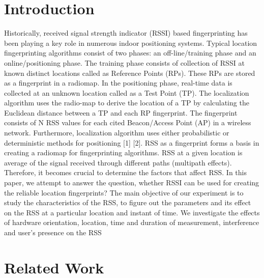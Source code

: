 \documentclass[conference]{IEEEtran}
\begin{document}
	\section{Introduction}
	Historically, received signal strength indicator (RSSI) based
	fingerprinting has been playing a key role in numerous indoor
	positioning systems. Typical location fingerprinting algorithms
	consist of two phases: an off-line/training phase and an online/positioning phase. The training phase consists of collection of RSSI at known distinct locations called as Reference
	Points (RPs). These RPs are stored as a fingerprint in a radiomap. In the positioning phase, real-time data is collected
	at an unknown location called as a Test Point (TP). The
	localization algorithm uses the radio-map to derive the location
	of a TP by calculating the Euclidean distance between a
	TP and each RP fingerprint. The fingerprint consists of N
	RSS values for each cited Beacon/Access Point (AP) in a
	wireless network. Furthermore, localization algorithm uses
	either probabilistic or deterministic methods for positioning
	[1] [2]. RSS as a fingerprint forms a basis in creating a radiomap for fingerprinting algorithms.
	RSS at a given location is average of the signal received
	through different paths (multipath effects). Therefore, it becomes crucial to determine the factors that affect RSS. In this
	paper, we attempt to answer the question, whether RSSI can be
	used for creating the reliable location fingerprints? The main
	objective of our experiment is to study the characteristics of
	the RSS, to figure out the parameters and its effect on the RSS
	at a particular location and instant of time. We investigate the
	effects of hardware orientation, location, time and duration of
	measurement, interference and user’s presence on the RSS
	
	\section{Related Work}
	
\end{document}

